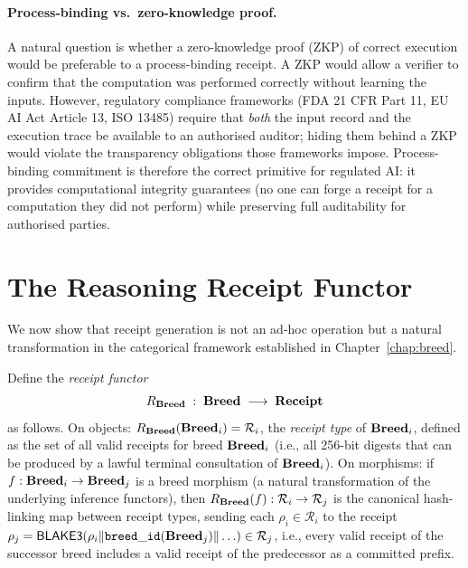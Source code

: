 \paragraph{Process-binding vs.\ zero-knowledge proof.}
A natural question is whether a zero-knowledge proof (ZKP) of correct execution would
be preferable to a process-binding receipt.  A ZKP would allow a verifier to confirm that
the computation was performed correctly without learning the inputs.  However, regulatory
compliance frameworks (FDA 21 CFR Part 11, EU AI Act Article 13, ISO 13485) require that
\emph{both} the input record and the execution trace be available to an authorised auditor;
hiding them behind a ZKP would violate the transparency obligations those frameworks impose.
Process-binding commitment is therefore the correct primitive for regulated AI: it provides
computational integrity guarantees (no one can forge a receipt for a computation they did
not perform) while preserving full auditability for authorised parties.

\section{The Reasoning Receipt Functor}
\label{sec:receipt-functor}

We now show that receipt generation is not an ad-hoc operation but a natural transformation
in the categorical framework established in Chapter~\ref{chap:breed}.

\begin{definition}
\label{def:receipt-functor}
Define the \emph{receipt functor}
\[
  R_{\mathbf{Breed}} \;:\; \mathbf{Breed} \;\longrightarrow\; \mathbf{Receipt}
\]
as follows.  On objects: $R_{\mathbf{Breed}}(\mathbf{Breed}_i) = \mathcal{R}_i$, the \emph{receipt type}
of $\mathbf{Breed}_i$, defined as the set of all valid receipts for breed $\mathbf{Breed}_i$
(i.e., all 256-bit digests that can be produced by a lawful terminal consultation of
$\mathbf{Breed}_i$).  On morphisms: if $f : \mathbf{Breed}_i \to \mathbf{Breed}_j$ is a breed morphism (a natural
transformation of the underlying inference functors), then
$R_{\mathbf{Breed}}(f) : \mathcal{R}_i \to \mathcal{R}_j$ is the canonical hash-linking map
between receipt types, sending each $\rho_i \in \mathcal{R}_i$ to the receipt
$\rho_j = \mathsf{BLAKE3}(\rho_i \| \mathtt{breed\_id}(\mathbf{Breed}_j) \| \ldots) \in \mathcal{R}_j$,
i.e., every valid receipt of the successor breed includes a valid receipt of the
predecessor as a committed prefix.
\end{definition}

